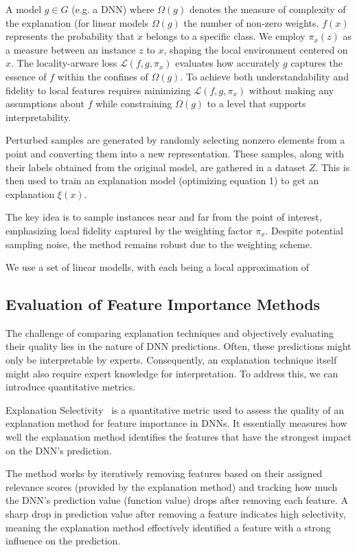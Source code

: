 \documentclass{article}
\begin{document}
A model $g \in G$ (e.g. a DNN) where $\Omega(g)$ denotes the measure of complexity of the explanation (for linear models $\Omega(g)$ the number of non-zero weights. 
$f(x)$ represents the probability that $x$ belongs to a specific class.
We employ $\pi_x(z)$ as a measure between an instance $z$ to $x$, shaping the local environment centered on $x$. 
The locality-arware loss $\mathcal{L}(f, g, \pi_x)$ evaluates how accurately $g$ captures the essence of $f$ within the confines of $\Omega(g)$. 
To achieve both understandability and fidelity to local features requires minimizing $\mathcal{L}(f, g, \pi_x)$ without making any assumptions about $f$ while constraining $\Omega(g)$ to a level that supports interpretability. 

Perturbed samples are generated by randomly selecting nonzero elements from a point and converting them into a new representation. These samples, along with their labels obtained from the original model, are gathered in a dataset $Z$. This is then used to train an explanation model (optimizing equation 1) to get an explanation $\xi(x)$. 

The key idea is to sample instances near and far from the point of interest, emphasizing local fidelity captured by the weighting factor $\pi_x$. Despite potential sampling noise, the method remains robust due to the weighting scheme. 

We use a set of linear modells, with each being a local approximation of  


\subsection{Evaluation of Feature Importance Methods}
The challenge of comparing explanation techniques and objectively evaluating their quality lies in the nature of DNN predictions. Often, these predictions might only be interpretable by experts. Consequently, an explanation technique itself might also require expert knowledge for interpretation. To address this, we can introduce quantitative metrics.

Explanation Selectivity~\cite{MONTAVON20181} is a quantitative metric used to assess the quality of an explanation method for feature importance in DNNs. It essentially measures how well the explanation method identifies the features that have the strongest impact on the DNN's prediction.

The method works by iteratively removing features based on their assigned relevance scores (provided by the explanation method) and tracking how much the DNN's prediction value (function value) drops after removing each feature. A sharp drop in prediction value after removing a feature indicates high selectivity, meaning the explanation method effectively identified a feature with a strong influence on the prediction.
\end{document}
